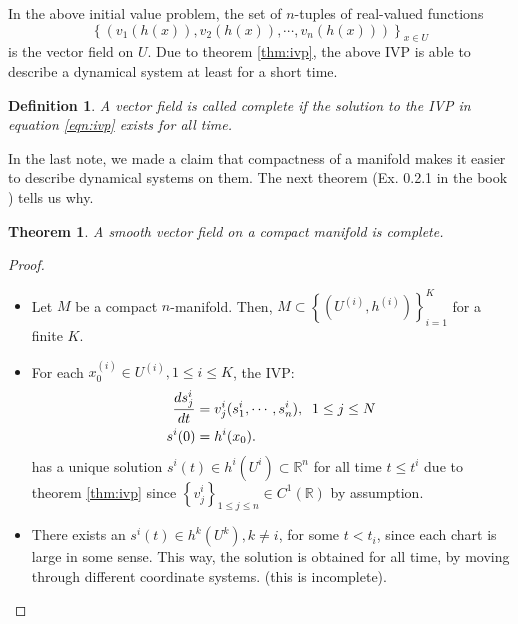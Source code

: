 \documentclass[11pt]{article}
\newtheorem{theorem}{Theorem}[section]
\newtheorem{definition}{Definition}
\begin{document}
In the above initial value problem, the set of $n$-tuples of real-valued 
functions 
$$\left\{ (v_1(h(x)),v_2(h(x)),\cdots,v_n(h(x))) \right\}_{x \in U}$$ is the vector field on $U$. Due to theorem \ref{thm:ivp}, the above IVP is able
to describe a dynamical system at least for a short time.  
\begin{definition}
A vector field is called \emph{complete} if the solution to 
the IVP in equation \ref{eqn:ivp} exists for all time.  
\end{definition}

In the last note, we made a claim that compactness of a 
manifold makes it easier to describe dynamical systems 
on them. The next theorem (Ex. 0.2.1 in the book \cite{katok}) 
tells us why.

\begin{theorem}
A smooth vector field on a compact manifold is complete.
\end{theorem}

\begin{proof}
\begin{itemize}
\item Let $M$ be a compact $n$-manifold. Then,
$M \subset \left\{(U^{(i)},h^{(i)})\right\}_{i=1}^K$ for a 
finite $K$.

\item For each $x_0^{(i)} \in U^{(i)}, 1 \leq i \leq K$,
the IVP: 
\begin{align}
\notag \frac{d s^i_j}{dt} &= v_j^i(s^i_1,\cdots,s^i_n),\;\; 1 \leq j \leq N \\
s^i(0) &= h^i(x_0).
\label{eqn:ivp}
\end{align}    
has a unique solution $s^i(t) \in h^i(U^i) \subset \mathbb{R}^n$ for 
all time $t \leq t^i$ due to theorem \ref{thm:ivp} since 
$\left\{ v^i_j \right\}_{1\leq j\leq n} \in C^1(\mathbb{R})$ by assumption. 

\item There exists an $s^i(t) \in h^k(U^k), k \neq i$, for some $t < t_i$, 
since each chart is large in some sense. This way, the solution is obtained
for all time, by moving through different coordinate systems.
(this is incomplete). 
\end{itemize}
\end{proof}



\end{document}
